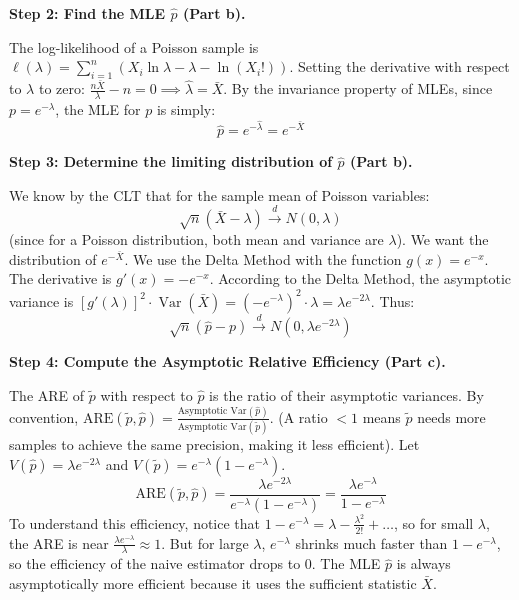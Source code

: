 \begin{solution}
\textbf{Step 2: Find the MLE $\hat{p}$ (Part b).}

The log-likelihood of a Poisson sample is $\ell(\lambda) = \sum_{i=1}^n (X_i \ln \lambda - \lambda - \ln(X_i!))$.
Setting the derivative with respect to $\lambda$ to zero: $\frac{n\bar{X}}{\lambda} - n = 0 \implies \hat{\lambda} = \bar{X}$.
By the invariance property of MLEs, since $p = e^{-\lambda}$, the MLE for $p$ is simply:
\[ \hat{p} = e^{-\hat{\lambda}} = e^{-\bar{X}} \]

\textbf{Step 3: Determine the limiting distribution of $\hat{p}$ (Part b).}

We know by the CLT that for the sample mean of Poisson variables:
\[ \sqrt{n}(\bar{X} - \lambda) \xrightarrow{d} N(0, \lambda) \]
(since for a Poisson distribution, both mean and variance are $\lambda$).
We want the distribution of $e^{-\bar{X}}$. We use the Delta Method with the function $g(x) = e^{-x}$.
The derivative is $g'(x) = -e^{-x}$.
According to the Delta Method, the asymptotic variance is $[g'(\lambda)]^2 \cdot \operatorname{Var}(\bar{X}) = (-e^{-\lambda})^2 \cdot \lambda = \lambda e^{-2\lambda}$.
Thus:
\[ \sqrt{n}(\hat{p} - p) \xrightarrow{d} N(0, \lambda e^{-2\lambda}) \]

\textbf{Step 4: Compute the Asymptotic Relative Efficiency (Part c).}

The ARE of $\tilde{p}$ with respect to $\hat{p}$ is the ratio of their asymptotic variances.
By convention, $\text{ARE}(\tilde{p}, \hat{p}) = \frac{\text{Asymptotic Var}(\hat{p})}{\text{Asymptotic Var}(\tilde{p})}$. (A ratio $< 1$ means $\tilde{p}$ needs more samples to achieve the same precision, making it less efficient).
Let $V(\hat{p}) = \lambda e^{-2\lambda}$ and $V(\tilde{p}) = e^{-\lambda}(1 - e^{-\lambda})$.
\[ \text{ARE}(\tilde{p}, \hat{p}) = \frac{\lambda e^{-2\lambda}}{e^{-\lambda}(1 - e^{-\lambda})} = \frac{\lambda e^{-\lambda}}{1 - e^{-\lambda}} \]
To understand this efficiency, notice that $1 - e^{-\lambda} = \lambda - \frac{\lambda^2}{2!} + \dots$, so for small $\lambda$, the ARE is near $\frac{\lambda e^{-\lambda}}{\lambda} \approx 1$. 
But for large $\lambda$, $e^{-\lambda}$ shrinks much faster than $1-e^{-\lambda}$, so the efficiency of the naive estimator drops to 0. The MLE $\hat{p}$ is always asymptotically more efficient because it uses the sufficient statistic $\bar{X}$.
\end{solution}
